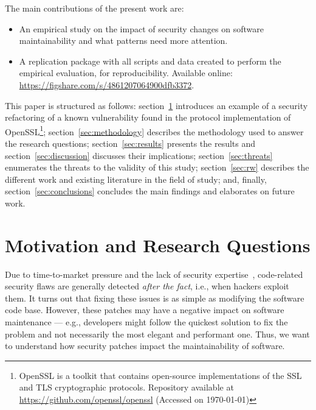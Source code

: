 \documentclass[10pt,conference]{IEEEtran}
\begin{document}
The main contributions of the present work are:
%
\begin{itemize}
	\item An empirical study on the impact of security changes on software
	maintainability and what patterns need more attention.
	\item A replication package with all scripts and data created to perform the
	empirical evaluation, for reproducibility. Available online:
  \url{https://figshare.com/s/4861207064900dfb3372}.
\end{itemize}
%
This paper is structured as follows: section~\ref{sec:motivation} introduces an
example of a security refactoring of a known vulnerability found in the
protocol implementation of OpenSSL\footnote{\label{openssl}OpenSSL is a toolkit that
contains open-source implementations of the SSL and TLS cryptographic
protocols. Repository available at \url{https://github.com/openssl/openssl}
(Accessed on \today{})}; section~\ref{sec:methodology} describes the
methodology used to answer the research questions; section~\ref{sec:results}
presents the results and section~\ref{sec:discussion} discusses their
implications; section~\ref{sec:threats} enumerates the threats to the validity of
this study; section~\ref{sec:rw} describes the different work and existing
literature in the field of study; and, finally, section~\ref{sec:conclusions}
concludes the main findings and elaborates on future work.
%
\section{Motivation and Research Questions}\label{sec:motivation}
%
Due to time-to-market pressure and the lack of security expertise~\cite{8077802}, code-related
security flaws are generally detected \textit{after the fact}, i.e., when
hackers exploit them. It turns out that fixing these issues is as simple as
modifying the software code base. However, these patches may have a
negative impact on software maintenance --- e.g., developers might follow the
quickest solution to fix the problem and not necessarily the most elegant and
performant one. Thus, we want to understand how security patches impact
the maintainability of software. 
\end{document}
